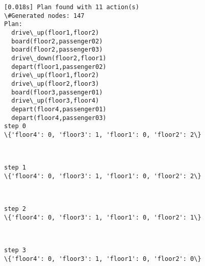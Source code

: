 \documentclass[11pt]{article}
\begin{document}
    \begin{Verbatim}[commandchars=\\\{\}]
[0.018s] Plan found with 11 action(s)
\#Generated nodes: 147
Plan:
  drive\_up(floor1,floor2)
  board(floor2,passenger02)
  board(floor2,passenger03)
  drive\_down(floor2,floor1)
  depart(floor1,passenger02)
  drive\_up(floor1,floor2)
  drive\_up(floor2,floor3)
  board(floor3,passenger01)
  drive\_up(floor3,floor4)
  depart(floor4,passenger01)
  depart(floor4,passenger03)
step 0
\{'floor4': 0, 'floor3': 1, 'floor1': 0, 'floor2': 2\}

    \end{Verbatim}

    \begin{center}
    \end{center}
    { \hspace*{\fill} \\}
    
    \begin{Verbatim}[commandchars=\\\{\}]
step 1
\{'floor4': 0, 'floor3': 1, 'floor1': 0, 'floor2': 2\}

    \end{Verbatim}

    \begin{center}
    \end{center}
    { \hspace*{\fill} \\}
    
    \begin{Verbatim}[commandchars=\\\{\}]
step 2
\{'floor4': 0, 'floor3': 1, 'floor1': 0, 'floor2': 1\}

    \end{Verbatim}

    \begin{center}
    \end{center}
    { \hspace*{\fill} \\}
    
    \begin{Verbatim}[commandchars=\\\{\}]
step 3
\{'floor4': 0, 'floor3': 1, 'floor1': 0, 'floor2': 0\}

    \end{Verbatim}
\end{document}
